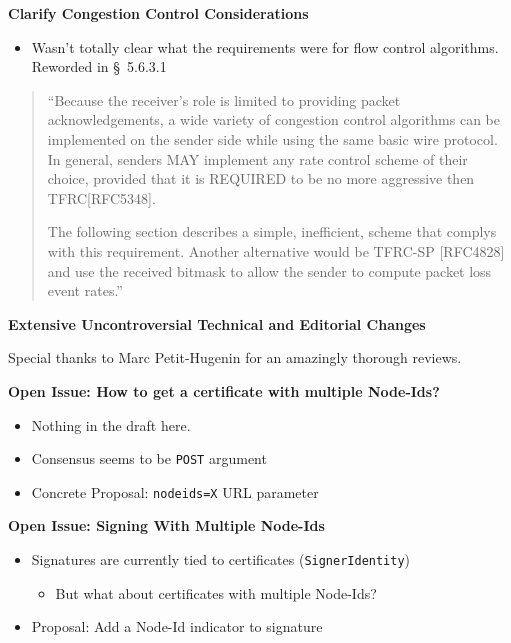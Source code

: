 \documentclass[helvetica]{seminar}
\newcommand{\heading}[1]{%
  \begin{center} 
    \large\bf 
    #1 
  \end{center} 
  \vspace{.4 in}}
\begin{document}
\begin{slide}
\heading{Clarify Congestion Control Considerations}

\begin{itemize}
\item Wasn't totally clear what the requirements were for flow control algorithms.
Reworded in \S\ 5.6.3.1
\end{itemize}

\small{
\begin{quote}
   ``Because the receiver's role is limited to providing packet
   acknowledgements, a wide variety of congestion control algorithms can
   be implemented on the sender side while using the same basic wire
   protocol.  In general, senders MAY implement any rate control scheme
   of their choice, provided that it is REQUIRED to be no more
   aggressive then TFRC[RFC5348].

   The following section describes a simple, inefficient, scheme that
   complys with this requirement.  Another alternative would be TFRC-SP
   [RFC4828] and use the received bitmask to allow the sender to compute
   packet loss event rates.''
\end{quote}
}

\end{slide}

\begin{slide}
\heading{Extensive Uncontroversial Technical and Editorial Changes}

Special thanks to Marc Petit-Hugenin for an amazingly thorough reviews.
\end{slide}


\begin{slide}
\heading{Open Issue: How to get a certificate with multiple Node-Ids?}

\begin{itemize}
\item Nothing in the draft here.
\item Consensus seems to be \verb^POST^ argument
\item Concrete Proposal: \verb^nodeids=X^ URL parameter
\end{itemize}

\end{slide}



\begin{slide}
\heading{Open Issue: Signing With Multiple Node-Ids}

\begin{itemize}
\item Signatures are currently tied to certificates (\verb^SignerIdentity^)
  \begin{itemize}
  \item But what about certificates with multiple Node-Ids?
  \end{itemize}

\item Proposal: Add a Node-Id indicator to signature 
\end{itemize}
\end{slide}
\end{document}
